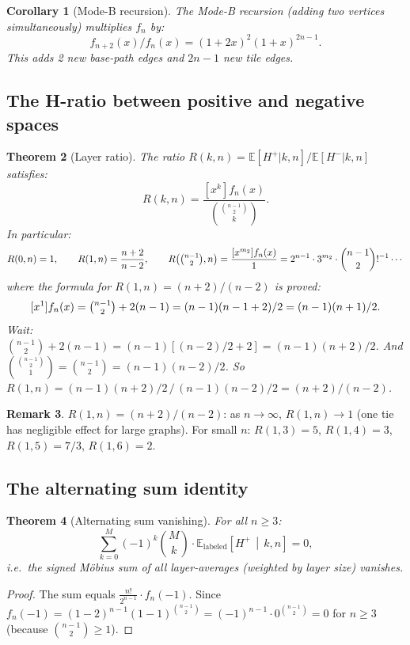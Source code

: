 \documentclass[12pt,reqno]{amsart}
\newtheorem{theorem}{Theorem}[section]
\newtheorem{corollary}[theorem]{Corollary}
\theoremstyle{definition}
\newtheorem{remark}[theorem]{Remark}
\theoremstyle{plain}
\begin{document}
\begin{corollary}[Mode-B recursion]
The Mode-B recursion (adding two vertices simultaneously) multiplies $f_n$ by:
\[
  f_{n+2}(x)/f_n(x)=(1+2x)^2(1+x)^{2n-1}.
\]
This adds 2 new base-path edges and $2n-1$ new tile edges.
\end{corollary}

\subsection{The H-ratio between positive and negative spaces}
\label{ssec:ratio}

\begin{theorem}[Layer ratio]\label{thm:layer-ratio}
The ratio $R(k,n)=\mathbb{E}[H^+|k,n]/\mathbb{E}[H^-|k,n]$ satisfies:
\[
  R(k,n)=\frac{[x^k]f_n(x)}{\binom{\binom{n-1}{2}}{k}}.
\]
In particular:
\[
  R(0,n)=1,\qquad
  R(1,n)=\frac{n+2}{n-2},\qquad
  R\!\left(\tbinom{n-1}{2},n\right)=\frac{[x^{m_2}]f_n(x)}{1}=2^{n-1}\cdot 3^{m_2}\cdot\binom{n-1}{2}!^{-1}\cdots
\]
where the formula for $R(1,n)=(n+2)/(n-2)$ is proved:
\[
  [x^1]f_n(x)=\tbinom{n-1}{2}+2(n-1)=(n-1)(n-1+2)/2=(n-1)(n+1)/2.
\]
Wait: $\binom{n-1}{2}+2(n-1)=(n-1)[(n-2)/2+2]=(n-1)(n+2)/2$.
And $\binom{\binom{n-1}{2}}{1}=\binom{n-1}{2}=(n-1)(n-2)/2$.
So $R(1,n)=(n-1)(n+2)/2\,/\,(n-1)(n-2)/2=(n+2)/(n-2)$.
\end{theorem}

\begin{remark}
$R(1,n)=(n+2)/(n-2)$: as $n\to\infty$, $R(1,n)\to 1$ (one tie has negligible
effect for large graphs).  For small $n$: $R(1,3)=5$, $R(1,4)=3$,
$R(1,5)=7/3$, $R(1,6)=2$.
\end{remark}

\subsection{The alternating sum identity}
\label{ssec:alt-sum}

\begin{theorem}[Alternating sum vanishing]\label{thm:alt-sum}
For all $n\ge 3$:
\[
  \sum_{k=0}^{M}(-1)^k\binom{M}{k}\cdot
  \mathbb{E}_{\mathrm{labeled}}\!\left[H^+\,\middle|\,k,n\right]=0,
\]
i.e.\ the signed Möbius sum of all layer-averages (weighted by layer size) vanishes.
\end{theorem}

\begin{proof}
The sum equals $\frac{n!}{2^{n-1}}\cdot f_n(-1)$.
Since $f_n(-1)=(1-2)^{n-1}(1-1)^{\binom{n-1}{2}}=(-1)^{n-1}\cdot 0^{\binom{n-1}{2}}=0$
for $n\ge 3$ (because $\binom{n-1}{2}\ge 1$).
\end{proof}
\end{document}
